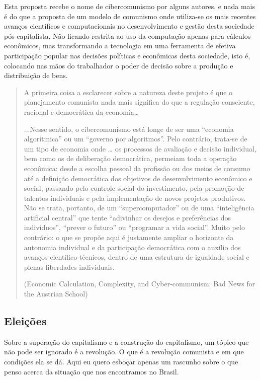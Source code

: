 Esta proposta recebe o nome de cibercomunismo por alguns autores, e nada mais é do que a proposta de um modelo de comunismo onde utiliza-se os mais recentes avanços científicos e computacionais no desenvolvimento e gestão desta sociedade pós-capitalista. Não ficando restrita ao uso da computação apenas para cálculos econômicos, mas transformando a tecnologia em uma ferramenta de efetiva participação popular nas decisões políticas e econômicas desta sociedade, isto é, colocando nas mãos do trabalhador o poder de decisão sobre a produção e distribuição de bens.

\begin{quote}
A primeira coisa a esclarecer sobre a natureza deste projeto é que o planejamento comunista nada mais significa do que a regulação consciente, racional e democrática da economia…

...Nesse sentido, o cibercomunismo está longe de ser uma “economia algorítmica” ou um “governo por algoritmos”. Pelo contrário, trata-se de um tipo de economia onde … os processos de avaliação e decisão individual, bem como os de deliberação democrática, permeiam toda a operação econômica: desde a escolha pessoal da profissão ou dos meios de consumo até a definição democrática dos objetivos de desenvolvimento econômico e social, passando pelo controle social do investimento, pela promoção de talentos individuais e pela implementação de novos projetos produtivos. Não se trata, portanto, de um “supercomputador” ou de uma “inteligência artificial central” que tente “adivinhar os desejos e preferências dos indivíduos”, “prever o futuro” ou “programar a vida social”. Muito pelo contrário: o que se propõe aqui é justamente ampliar o horizonte da autonomia individual e da participação democrática com o auxílio dos avanços científico-técnicos, dentro de uma estrutura de igualdade social e plenas liberdades individuais.

(Economic Calculation, Complexity, and Cyber-communism: Bad News for the Austrian School)
\end{quote}

\subsection{Eleições}

Sobre a superação do capitalismo e a construção do capitalismo, um tópico que não pode ser ignorado é a revolução. O que é a revolução comunista e em que condições ela se dá. Aqui eu quero esboçar apenas um rascunho sobre o que penso acerca da situação que nos encontramos no Brasil.

